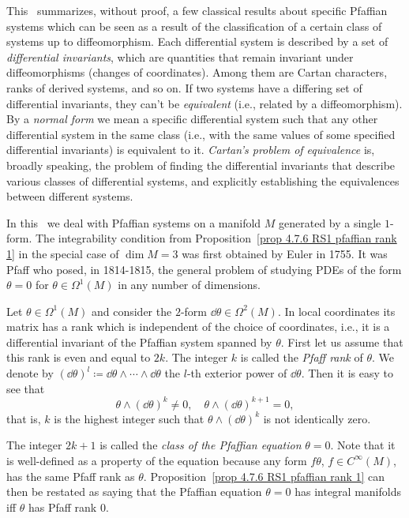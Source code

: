 This \sect\ summarizes, without proof, a few classical results about specific Pfaffian systems which can be seen as a result of the classification of a certain class of systems up to diffeomorphism. Each differential system is described by a set of \emph{differential invariants}, which are quantities that remain invariant under diffeomorphisms (changes of coordinates). Among them are Cartan characters, ranks of derived systems, and so on. If two systems have a differing set of differential invariants, they can't be \emph{equivalent} (i.e., related by a diffeomorphism). By a \emph{normal form} we mean a specific differential system such that any other differential system in the same class (i.e., with the same values of some specified differential invariants) is equivalent to it. \emph{Cartan's problem of equivalence} is, broadly speaking, the problem of finding the differential invariants that describe various classes of differential systems, and explicitly establishing the equivalences between different systems.

In this \sect\ we deal with Pfaffian systems on a manifold $M$ generated by a single $1$-form. The integrability condition from Proposition~\ref{prop 4.7.6 RS1 pfaffian rank 1} in the special case of $\dim M=3$ was first obtained by Euler in 1755. It was Pfaff who posed, in 1814-1815, the general problem of studying PDEs of the form $\theta=0$ for $\theta\in\Omega^1(M)$ in any number of dimensions.

Let $\theta\in\Omega^1(M)$ and consider the $2$-form $\dd\theta\in\Omega^2(M)$. In local coordinates its matrix has a rank which is independent of the choice of coordinates, i.e., it is a differential invariant of the Pfaffian system spanned by $\theta$. First let us assume that this rank is even and equal to $2k$. The integer $k$ is called the \emph{Pfaff rank} of $\theta$. We denote by $(\dd\theta)^l\coloneqq \dd\theta\wedge\cdots\wedge\dd\theta$ the $l$-th exterior power of $\dd\theta$. Then it is easy to see that 
\[\theta\wedge(\dd\theta)^{k}\neq 0,\quad \theta\wedge(\dd\theta)^{k+1}=0,\]
that is, $k$ is the highest integer such that $\theta\wedge(\dd\theta)^{k}$ is not identically zero. 

The integer $2k+1$ is called the \emph{class of the Pfaffian equation} $\theta=0$. Note that it is well-defined as a property of the equation because any form $f\theta$, $f\in C^\infty(M)$, has the same Pfaff rank as $\theta$. Proposition~\ref{prop 4.7.6 RS1 pfaffian rank 1} can then be restated as saying that the Pfaffian equation $\theta=0$ has integral manifolds iff $\theta$ has Pfaff rank $0$.

